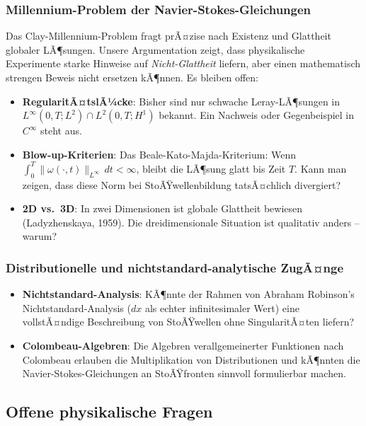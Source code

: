 ﻿\documentclass[12pt,a4paper]{article}
\theoremstyle{definition}
\theoremstyle{remark}
\begin{document}
\subsubsection{Millennium-Problem der Navier-Stokes-Gleichungen}

Das Clay-Millennium-Problem fragt prÃ¤zise nach Existenz und Glattheit globaler LÃ¶sungen. Unsere Argumentation zeigt, dass physikalische Experimente starke Hinweise auf \emph{Nicht-Glattheit} liefern, aber einen mathematisch strengen Beweis nicht ersetzen kÃ¶nnen. Es bleiben offen:

\begin{itemize}
\item \textbf{RegularitÃ¤tslÃ¼cke}: Bisher sind nur schwache Leray-LÃ¶sungen in $L^\infty(0,T; L^2) \cap L^2(0,T; H^1)$ bekannt. Ein Nachweis oder Gegenbeispiel in $C^\infty$ steht aus.
\item \textbf{Blow-up-Kriterien}: Das Beale-Kato-Majda-Kriterium: Wenn $\int_0^T \|\omega(\cdot,t)\|_{L^\infty}\,dt < \infty$, bleibt die LÃ¶sung glatt bis Zeit $T$. Kann man zeigen, dass diese Norm bei StoÃŸwellenbildung tatsÃ¤chlich divergiert?
\item \textbf{2D vs.\ 3D}: In zwei Dimensionen ist globale Glattheit bewiesen (Ladyzhenskaya, 1959). Die dreidimensionale Situation ist qualitativ anders -- warum?
\end{itemize}

\subsubsection{Distributionelle und nichtstandard-analytische ZugÃ¤nge}

\begin{itemize}
\item \textbf{Nichtstandard-Analysis}: KÃ¶nnte der Rahmen von Abraham Robinson's Nicht\-standard-Analysis ($dx$ als echter infinitesimaler Wert) eine vollstÃ¤ndige Beschreibung von StoÃŸwellen ohne SingularitÃ¤ten liefern?
\item \textbf{Colombeau-Algebren}: Die Algebren verallgemeinerter Funktionen nach Colombeau erlauben die Multiplikation von Distributionen und kÃ¶nnten die Navier-Stokes-Gleichungen an StoÃŸfronten sinnvoll formulierbar machen.
\end{itemize}

\subsection{Offene physikalische Fragen}
\end{document}

